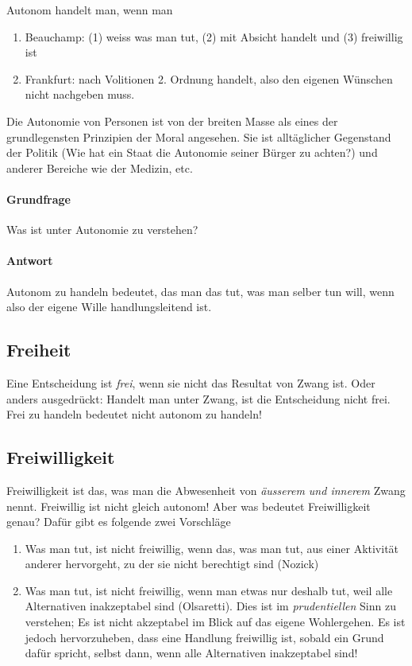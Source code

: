 \documentclass[../main.tex]{subfiles}
\begin{document}
\begin{warningbox}
Autonom handelt man, wenn man 
\begin{enumerate}
	\item Beauchamp: (1) weiss was man tut, (2) mit Absicht handelt und (3) freiwillig ist
	\item Frankfurt: nach Volitionen 2. Ordnung handelt, also den eigenen Wünschen nicht nachgeben muss. 
\end{enumerate}
\end{warningbox}

Die Autonomie von Personen ist von der breiten Masse als eines der grundlegensten Prinzipien der Moral angesehen. Sie ist alltäglicher Gegenstand der Politik (Wie hat ein Staat die Autonomie seiner Bürger zu achten?) und anderer Bereiche wie der Medizin, etc. 

\paragraph{Grundfrage} Was ist unter Autonomie zu verstehen?

\paragraph{Antwort} Autonom zu handeln bedeutet, das man das tut, was man selber tun will, wenn also der eigene Wille handlungsleitend ist. 

\subsection{Freiheit}
Eine Entscheidung ist \textit{frei}, wenn sie nicht das Resultat von Zwang ist. Oder anders ausgedrückt: Handelt man unter Zwang, ist die Entscheidung nicht frei. Frei zu handeln bedeutet nicht autonom zu handeln!

\subsection{Freiwilligkeit} 
Freiwilligkeit ist das, was man die Abwesenheit von \textit{äusserem und innerem} Zwang nennt. Freiwillig ist nicht gleich autonom! Aber was bedeutet Freiwilligkeit genau? Dafür gibt es folgende zwei Vorschläge
\begin{enumerate}[label=(\alph*)]
	\item Was man tut, ist nicht freiwillig, wenn das, was man tut, aus einer Aktivität anderer hervorgeht, zu der sie nicht berechtigt sind (Nozick)
	\item Was man tut, ist nicht freiwillig, wenn man etwas nur deshalb tut, weil alle Alternativen inakzeptabel sind (Olsaretti). Dies ist im \textit{prudentiellen} Sinn zu verstehen; Es ist nicht akzeptabel im Blick auf das eigene Wohlergehen. Es ist jedoch hervorzuheben, dass eine Handlung freiwillig ist, sobald ein Grund dafür spricht, selbst dann, wenn alle Alternativen inakzeptabel sind!
\end{enumerate} 
\end{document}
